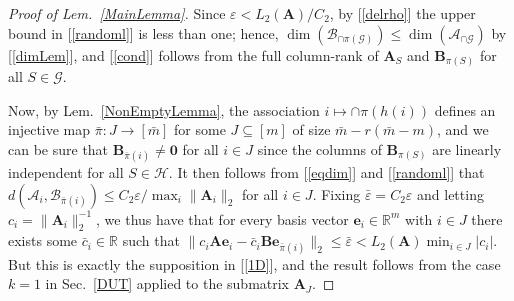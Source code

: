 \documentclass[9pt,twocolumn]{pnas-new}
\newtheorem{problem}{Problem}
\renewcommand{\eqref}[1]{\textnormal{[\ref{#1}]}}
\begin{document}
\begin{proof}[Proof of Lem.~\ref{MainLemma}]
Since $\varepsilon < L_2(\mathbf{A}) / C_2$, by \eqref{delrho} the upper bound in \eqref{randoml} is less than one; hence, $\dim(\bm{\mathcal{B}}_{\cap \pi(\mathcal{G})}) \leq \dim(\bm{\mathcal{A}}_{\cap \mathcal{G}})$ by \eqref{dimLem}, and \eqref{cond} follows from the full column-rank of $\mathbf{A}_{S}$ and $\mathbf{B}_{\pi(S)}$ for all $S \in \mathcal{G}$.

Now, by Lem.~\ref{NonEmptyLemma}, the association $i \mapsto \cap \pi(h(i))$ defines an injective map $\bar \pi: J \to [\bar m]$ for some $J \subseteq [m]$ of size $\bar m - r(\bar m - m)$, and we can be sure that $\mathbf{B}_{\bar \pi(i)} \neq \mathbf{0}$ for all $i \in J$ since the columns of $\mathbf{B}_{\pi(S)}$ are linearly independent for all $S \in \mathcal{H}$. It then follows from \eqref{eqdim} and \eqref{randoml} that $d\left( \bm{\mathcal{A}}_i, \bm{\mathcal{B}}_{\bar \pi(i)} \right) \leq C_2 \varepsilon / \max_i \|\mathbf{A}_i\|_2$ for all $i \in J$. Fixing $\bar \varepsilon = C_2\varepsilon$ and letting $c_i = \|\mathbf{A}_i\|_2^{-1}$, we thus have that for every basis vector $\mathbf{e}_i \in \mathbb{R}^m$ with $i \in J$ there exists some $\bar{c}_i \in \mathbb{R}$ such that $\|c_i\mathbf{A}\mathbf{e}_i - \bar{c}_i \mathbf{B}\mathbf{e}_{\bar \pi(i)}\|_2 \leq \bar \varepsilon < L_2(\mathbf{A}) \min_{i\in J} |c_i|$.  But this is exactly the supposition in \eqref{1D}, and the result follows from the case $k=1$ in Sec.~\ref{DUT} applied to the submatrix $\mathbf{A}_J$.
\end{proof}



%
\end{document}

